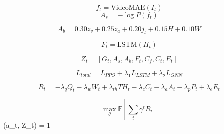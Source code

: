 
$$ f_t = \text{VideoMAE}(I_t) $$
$$ A_s = -\log P(f_t) $$

$$ A_b = 0.30z_v + 0.25z_a + 0.20j_t + 0.15H + 0.10W $$

$$ F_t = \text{LSTM}(H_t) $$

$$ Z_t = [G_t, A_s, A_b, F_t, C_f, C_t, E_t] $$

$$ L_{total} = L_{PPO} + \lambda_1 L_{LSTM} + \lambda_2 L_{GNN} $$

$$ R_t = -\lambda_q Q_t - \lambda_w W_t + \lambda_{th} TH_t - \lambda_c C_t - \lambda_a A_t - \lambda_p P_t + \lambda_e E_t $$

$$ \max_\theta \mathbb{E} \left[ \sum_t \gamma^t R_t \right] $$
 (a_t, Z_t) = 1
